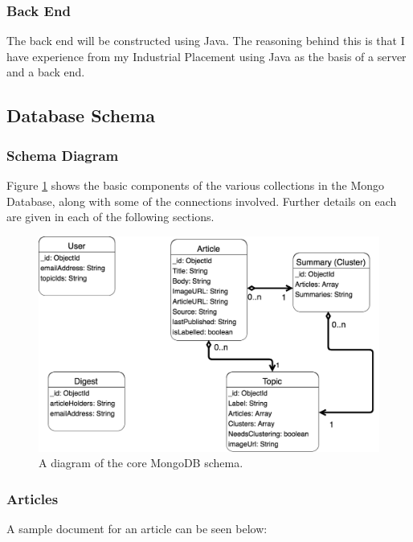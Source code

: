\documentclass[12pt]{article}
\begin{document}
\subsubsection{Back End}

The back end will be constructed using Java. The reasoning behind this is that I have experience from my Industrial Placement using Java as the basis of a server and a back end.

\subsection{Database Schema}

\label{database}

\subsubsection{Schema Diagram}

Figure \ref{dbschema} shows the basic components of the various collections in the Mongo Database, along with some of the connections involved. Further details on each are given in each of the following sections.

\begin{figure}[ht!]
  \centering
    \includegraphics[width=\textwidth]{DBSchema.png}
   \caption[A diagram of the MongoDB schema]{A diagram of the core MongoDB schema.}
   \label{dbschema}
\end{figure} 

\subsubsection{Articles}

A sample document for an article can be seen below:
\end{document}
